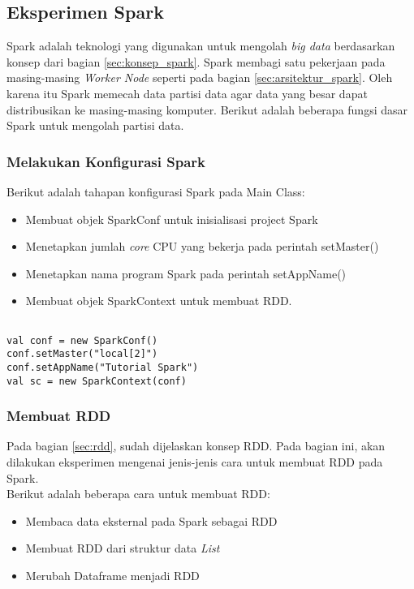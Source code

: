 \subsection{Eksperimen Spark}
Spark adalah teknologi yang digunakan untuk mengolah \textit{big data} berdasarkan konsep dari bagian \ref{sec:konsep_spark}. Spark membagi satu pekerjaan pada masing-masing \textit{Worker Node} seperti pada bagian \ref{sec:arsitektur_spark}. Oleh karena itu Spark memecah data partisi data agar data yang besar dapat distribusikan ke masing-masing komputer. Berikut adalah beberapa fungsi dasar Spark untuk mengolah partisi data.

\subsubsection{Melakukan Konfigurasi Spark}
Berikut adalah tahapan konfigurasi Spark pada Main Class:
\begin{itemize}
\item Membuat objek SparkConf untuk inisialisasi project Spark
\item Menetapkan jumlah \textit{core} CPU yang bekerja pada perintah setMaster()
\item Menetapkan nama program Spark pada perintah setAppName()
\item Membuat objek SparkContext untuk membuat RDD.

\end{itemize}

\begin{lstlisting}[basicstyle=\ttfamily, frame=single,
	columns=fullflexible, keepspaces=true, breaklines=true, label=ls_kepatuhan_1_1_1_logo_sharif_judge, caption=Konfigurasi Spark]
	
val conf = new SparkConf()
conf.setMaster("local[2]")
conf.setAppName("Tutorial Spark")
val sc = new SparkContext(conf)

\end{lstlisting}
  
\newpage
\subsubsection{Membuat RDD}
Pada bagian \ref{sec:rdd}, sudah dijelaskan konsep RDD. Pada bagian ini, akan dilakukan eksperimen mengenai jenis-jenis cara untuk membuat RDD pada Spark.\\

\noindent Berikut adalah beberapa cara untuk membuat RDD:
\begin{itemize}
\item Membaca data eksternal pada Spark sebagai RDD
\item Membuat RDD dari struktur data \textit{List}
\item Merubah Dataframe menjadi RDD
\end{itemize}

